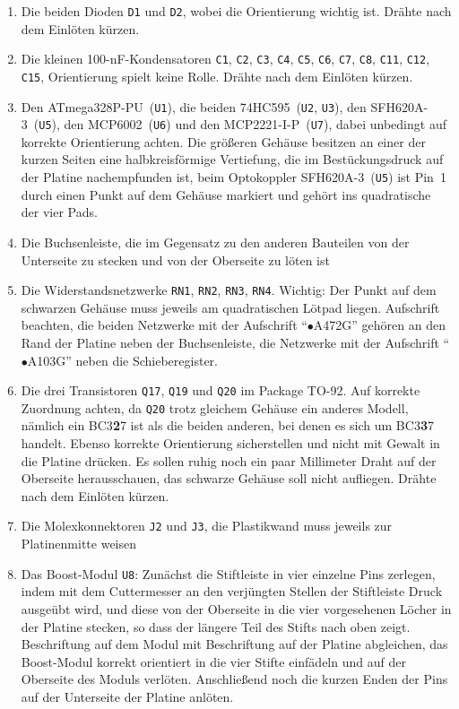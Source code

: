 \documentclass[paper=a4, open=any, numbers=noenddot]{scrbook}
\begin{document}
\begin{enumerate}
					\item
					      Die beiden Dioden \texttt{D1} und \texttt{D2}, wobei die Orientierung wichtig ist. Drähte nach dem Einlöten kürzen.
					\item
					      Die kleinen 100-nF-Kondensatoren \texttt{C1}, \texttt{C2}, \texttt{C3}, \texttt{C4}, \texttt{C5}, \texttt{C6}, \texttt{C7}, \texttt{C8}, \texttt{C11}, \texttt{C12}, \texttt{C15}, Orientierung spielt keine Rolle. Drähte nach dem Einlöten kürzen.
					\item
					      Den ATmega328P-PU~(\texttt{U1}), die beiden 74HC595~(\texttt{U2}, \texttt{U3}), den SFH620A-3~(\texttt{U5}), den MCP6002~(\texttt{U6}) und den MCP2221-I-P~(\texttt{U7}), dabei unbedingt auf korrekte Orientierung achten. Die größeren Gehäuse besitzen an einer der kurzen Seiten eine halbkreisförmige Vertiefung, die im Bestückungsdruck auf der Platine nachempfunden ist, beim Optokoppler SFH620A-3~(\texttt{U5}) ist Pin~1 durch einen Punkt auf dem Gehäuse markiert und gehört ins quadratische der vier Pads.
					\item
					      Die Buchsenleiste, die im Gegensatz zu den anderen Bauteilen von der Unterseite zu stecken und von der Oberseite zu löten ist
					\item
					      Die Widerstandsnetzwerke \texttt{RN1}, \texttt{RN2}, \texttt{RN3}, \texttt{RN4}. Wichtig: Der Punkt auf dem schwarzen Gehäuse muss jeweils am quadratischen Lötpad liegen. Aufschrift beachten, die beiden Netzwerke mit der Aufschrift \enquote{$\bullet$A472G} gehören an den Rand der Platine neben der Buchsenleiste, die Netzwerke mit der Aufschrift \enquote{$\bullet$A103G} neben die Schieberegister.
					\item
					      Die drei Transistoren \texttt{Q17}, \texttt{Q19} und \texttt{Q20} im Package TO-92. Auf korrekte Zuordnung achten, da \texttt{Q20} trotz gleichem Gehäuse ein anderes Modell, nämlich ein BC3\textbf{2}7 ist als die beiden anderen, bei denen es sich um BC3\textbf{3}7 handelt. Ebenso korrekte Orientierung sicherstellen und nicht mit Gewalt in die Platine drücken. Es sollen ruhig noch ein paar Millimeter Draht auf der Oberseite herausschauen, das schwarze Gehäuse soll nicht aufliegen. Drähte nach dem Einlöten kürzen.
					\item
					      Die Molexkonnektoren \texttt{J2} und \texttt{J3}, die Plastikwand muss jeweils zur Platinenmitte weisen
					\item
					      Das Boost-Modul \texttt{U8}: Zunächst die Stiftleiste in vier einzelne Pins zerlegen, indem mit dem Cuttermesser an den verjüngten Stellen der Stiftleiste Druck ausgeübt wird, und diese von der Oberseite in die vier vorgesehenen Löcher in der Platine stecken, so dass der längere Teil des Stifts nach oben zeigt. Beschriftung auf dem Modul mit Beschriftung auf der Platine abgleichen, das Boost-Modul korrekt orientiert in die vier Stifte einfädeln und auf der Oberseite des Moduls verlöten. Anschließend noch die kurzen Enden der Pins auf der Unterseite der Platine anlöten.

\end{enumerate}
\end{document}
